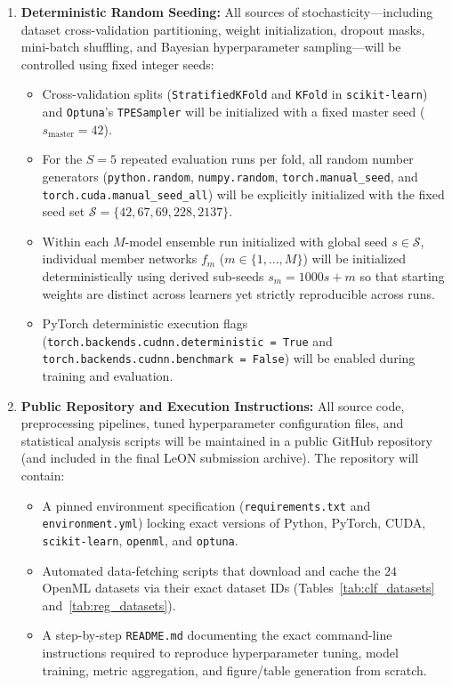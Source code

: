 \documentclass[11pt, a4paper]{article}
\begin{document}
\begin{enumerate}
    \item \textbf{Deterministic Random Seeding:} All sources of stochasticity—including dataset cross-validation partitioning, weight initialization, dropout masks, mini-batch shuffling, and Bayesian hyperparameter sampling—will be controlled using fixed integer seeds:
    \begin{itemize}
        \item Cross-validation splits (\texttt{StratifiedKFold} and \texttt{KFold} in \texttt{scikit-learn}) and \texttt{Optuna}'s \texttt{TPESampler} will be initialized with a fixed master seed ($s_{\text{master}} = 42$).
        \item For the $S = 5$ repeated evaluation runs per fold, all random number generators (\texttt{python.random}, \texttt{numpy.random}, \texttt{torch.manual\_seed}, and \texttt{torch.cuda.manual\_seed\_all}) will be explicitly initialized with the fixed seed set $\mathcal{S} = \{42, 67, 69, 228, 2137\}$.
        \item Within each $M$-model ensemble run initialized with global seed $s \in \mathcal{S}$, individual member networks $f_m$ ($m \in \{1, \dots, M\}$) will be initialized deterministically using derived sub-seeds $s_m = 1000 s + m$ so that starting weights are distinct across learners yet strictly reproducible across runs.
        \item PyTorch deterministic execution flags (\texttt{torch.backends.cudnn.deterministic = True} and \texttt{torch.backends.cudnn.benchmark = False}) will be enabled during training and evaluation.
    \end{itemize}
    \item \textbf{Public Repository and Execution Instructions:} All source code, preprocessing pipelines, tuned hyperparameter configuration files, and statistical analysis scripts will be maintained in a public GitHub repository (and included in the final LeON submission archive). The repository will contain:
    \begin{itemize}
        \item A pinned environment specification (\texttt{requirements.txt} and \texttt{environment.yml}) locking exact versions of Python, PyTorch, CUDA, \texttt{scikit-learn}, \texttt{openml}, and \texttt{optuna}.
        \item Automated data-fetching scripts that download and cache the $24$ OpenML datasets via their exact dataset IDs (Tables~\ref{tab:clf_datasets} and~\ref{tab:reg_datasets}).
        \item A step-by-step \texttt{README.md} documenting the exact command-line instructions required to reproduce hyperparameter tuning, model training, metric aggregation, and figure/table generation from scratch.
    \end{itemize}
\end{enumerate}
\end{document}
